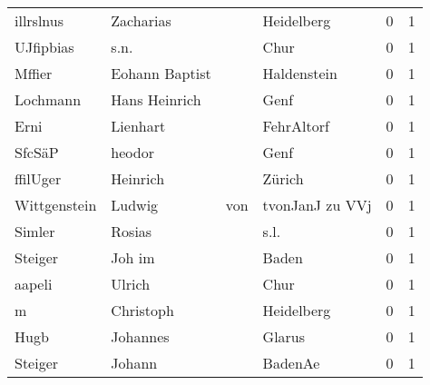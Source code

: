 \documentclass[10pt,a4paper,landscape]{article}
\begin{document}
\begin{longtable}{llllrr}
                illrslnus &                          Zacharias &             &                                  Heidelberg &          0 &         1 \\
                UJfipbias &                               s.n. &             &                                        Chur &          0 &         1 \\
                   Mffier &                     Eohann Baptist &             &                                 Haldenstein &          0 &         1 \\
                 Lochmann &                      Hans Heinrich &             &                                        Genf &          0 &         1 \\
                     Erni &                           Lienhart &             &                                  FehrAltorf &          0 &         1 \\
                   SfcSäP &                             heodor &             &                                        Genf &          0 &         1 \\
                 ffilUger &                           Heinrich &             &                                      Zürich &          0 &         1 \\
             Wittgenstein &                             Ludwig &         von &                             tvonJanJ zu VVj &          0 &         1 \\
                   Simler &                             Rosias &             &                                        s.l. &          0 &         1 \\
                  Steiger &                             Joh im &             &                                       Baden &          0 &         1 \\
                   aapeli &                             Ulrich &             &                                        Chur &          0 &         1 \\
                        m &                          Christoph &             &                                  Heidelberg &          0 &         1 \\
                     Hugb &                           Johannes &             &                                      Glarus &          0 &         1 \\
                  Steiger &                             Johann &             &                                     BadenAe &          0 &         1 \\

\end{longtable}
\end{document}
